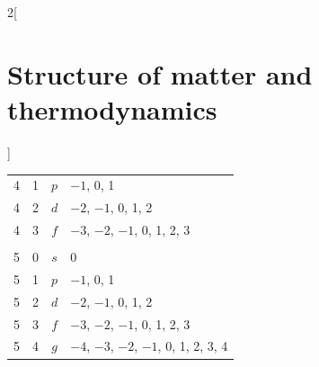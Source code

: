 \documentclass[../../../main.tex]{subfiles}
\begin{document}
\begin{multicols}{2}[\section{Structure of matter and thermodynamics}]
\begin{center}
\begin{minipage}{\linewidth}
\begin{tabular}{cccl}
                4   & 1      & $p$             & $-1$, 0, 1                            \\
                4   & 2      & $d$             & $-2$, $-1$, 0, 1, 2                   \\
                4   & 3      & $f$             & $-3$, $-2$, $-1$, 0, 1, 2, 3          \\
                    &        &                 &                                       \\
                5   & 0      & $s$             & 0                                     \\
                5   & 1      & $p$             & $-1$, 0, 1                            \\
                5   & 2      & $d$             & $-2$, $-1$, 0, 1, 2                   \\
                5   & 3      & $f$             & $-3$, $-2$, $-1$, 0, 1, 2, 3          \\
                5   & 4      & $g$             & $-4$, $-3$, $-2$, $-1$, 0, 1, 2, 3, 4 \\
                \hline
                \hline
            \end{tabular}
        \end{minipage}
    \end{center}

\end{multicols}
\end{document}
